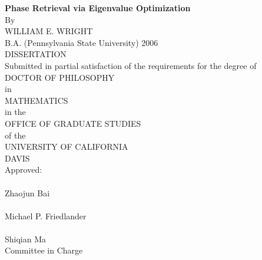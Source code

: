 \begin{center}
   \null\vfill
   \textbf{%
      Phase Retrieval via Eigenvalue Optimization
   }%
   \\
   \bigskip
   By \\
   \bigskip
   WILLIAM E. WRIGHT \\
   \bigskip
   B.A. (Pennsylvania State University) 2006 \\
   \bigskip
   DISSERTATION \\
   \bigskip
   Submitted in partial satisfaction of the requirements for the
   degree of \\
   \bigskip
   DOCTOR OF PHILOSOPHY \\
   \bigskip
   in \\
   \bigskip
   MATHEMATICS\\
   \bigskip
   in the \\
   \bigskip
   OFFICE OF GRADUATE STUDIES \\
   \bigskip        
   of the \\
   \bigskip
   UNIVERSITY OF CALIFORNIA \\
   \bigskip
   DAVIS \\
   \bigskip
   Approved: \\
   \bigskip
   \bigskip
   \makebox[3in]{\hrulefill} \\
   Zhaojun Bai \\
   \bigskip
   \bigskip
   \makebox[3in]{\hrulefill} \\
   Michael P. Friedlander \\
   \bigskip
   \bigskip
   \makebox[3in]{\hrulefill} \\
   Shiqian Ma \\
   \bigskip
   Committee in Charge \\
    \\
   \vfill
\end{center}
